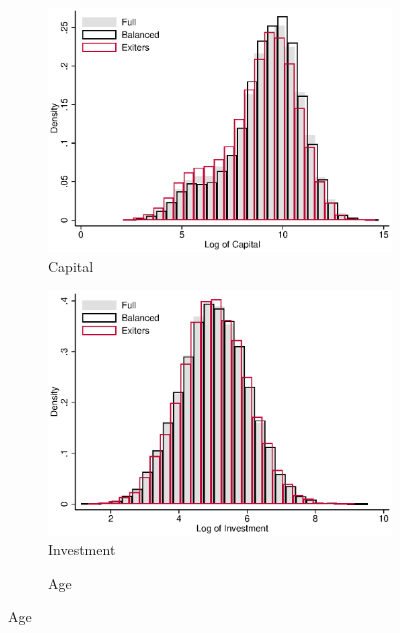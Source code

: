 \documentclass[11pt]{article}
\begin{document}
\begin{figure}[ht]
\begin{subfigure}[b]{.3\textwidth}
	\end{subfigure}\\
	\begin{subfigure}[b]{.3\textwidth}
		\centering
		\caption{Capital}
		\includegraphics[width=\textwidth]{histK.eps}
	\end{subfigure}
	\begin{subfigure}[b]{.3\textwidth}
		\centering
		\caption{Investment}
		\includegraphics[width=\textwidth]{histI.eps}
	\end{subfigure}
	\begin{subfigure}[b]{.3\textwidth}
	\centering
	\caption{Age}

\end{subfigure}
\end{figure}
\end{document}

